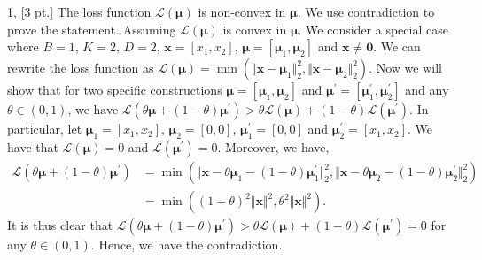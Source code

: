 \documentclass[12pt,letterpaper]{article}
\begin{document}
1, [3 pt.] The loss function $\mathcal{L}(\bm{\mu})$ is non-convex in $\bm{\mu}$. We use contradiction to prove the statement. Assuming $\mathcal{L}(\bm{\mu})$ is convex in $\bm{\mu}$. 
We consider a special case where $B = 1$, $K = 2$, $D = 2$, $\mathbf{x} = \left[x_1, x_2\right]$, $\mathbf{\bm{\mu}} = \left[\bm{\mu}_1, \bm{\mu}_2\right]$ and $\mathbf{x} \neq \mathbf{0}$. 
We can rewrite the loss function as $\mathcal{L}(\bm{\mu}) = \min(\Vert \mathbf{x} - \bm{\mu}_{1} \Vert_{2}^{2}, \Vert \mathbf{x} - \bm{\mu}_{2} \Vert_{2}^{2})$. 
Now we will show that for two specific constructions $\mathbf{\bm{\mu}} = \left[\bm{\mu}_1, \bm{\mu}_2\right]$ and $\mathbf{\bm{\mu}^{\prime}} = \left[\bm{\mu}_{1}^{\prime}, \bm{\mu}_{2}^{\prime}\right]$ and any $\theta \in (0, 1)$, we have $\mathcal{L}(\theta \bm{\mu} + (1 - \theta) \bm{\mu}^{\prime}) > \theta \mathcal{L}(\bm{\mu}) + (1 - \theta) \mathcal{L}(\bm{\mu}^{\prime})$. 
In particular, let $\bm{\mu}_{1} = \left[ x_{1}, x_{2} \right]$, $\bm{\mu}_{2} = \left[ 0, 0 \right]$, $\bm{\mu}_{1}^{\prime} = \left[ 0, 0 \right]$ and $\bm{\mu}_{2}^{\prime} = \left[ x_{1}, x_{2} \right]$. 
We have that $\mathcal{L}(\bm{\mu}) = 0$ and $\mathcal{L}(\bm{\mu}^{\prime}) = 0$. 
Moreover, we have,
\begin{align}
\mathcal{L}(\theta \bm{\mu} + (1 - \theta) \bm{\mu}^{\prime}) & = \min(\Vert \mathbf{x} - \theta \bm{\mu}_{1} - (1 - \theta) \bm{\mu}_{1}^{\prime} \Vert_{2}^{2}, \Vert \mathbf{x} - \theta \bm{\mu}_{2} - (1 - \theta) \bm{\mu}_{2}^{\prime} \Vert_{2}^{2}) \nonumber \\
& = \min( (1 - \theta)^{2} \Vert \mathbf{x} \Vert^{2}, \theta^{2} \Vert \mathbf{x} \Vert^{2} ).
\label{kmeans_ineq}
\end{align}
It is thus clear that $\mathcal{L}(\theta \bm{\mu} + (1 - \theta) \bm{\mu}^{\prime}) > \theta \mathcal{L}(\bm{\mu}) + (1 - \theta) \mathcal{L}(\bm{\mu}^{\prime}) = 0$ for any $\theta \in (0, 1)$. Hence, we have the contradiction.
\end{document}
